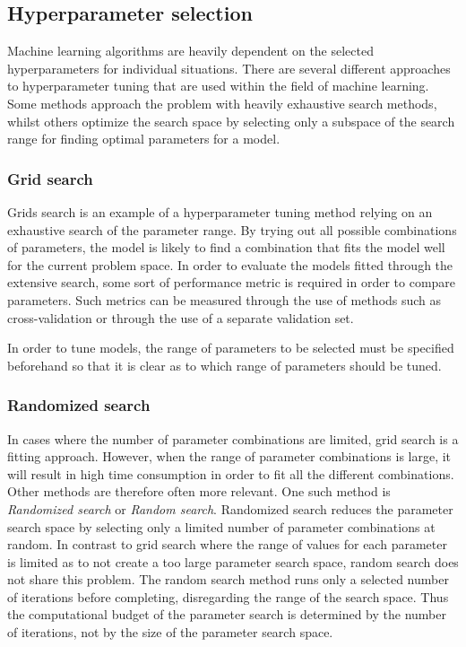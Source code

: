 \subsection{Hyperparameter selection}
\label{section:BT:Hyperparameters}

Machine learning algorithms are heavily dependent on the selected hyperparameters for individual situations.
There are several different approaches to hyperparameter tuning that are used within the field of machine learning.
Some methods approach the problem with heavily exhaustive search methods,
whilst others optimize the search space by selecting only a subspace of the search range for finding optimal parameters for a model.

\subsubsection{Grid search}
Grids search is an example of a hyperparameter tuning method relying on an exhaustive search of the parameter range.
By trying out all possible combinations of parameters, the model is likely to find a combination that fits the model well for the current problem space.
In order to evaluate the models fitted through the extensive search, some sort of performance metric is required in order to compare parameters.
Such metrics can be measured through the use of methods such as cross-validation or through the use of a separate validation set.

In order to tune models, the range of parameters to be selected must be specified beforehand so that it is clear as to which range of parameters should be tuned.
\cite{Geron2017}


\subsubsection{Randomized search}
In cases where the number of parameter combinations are limited, grid search is a fitting approach.
However, when the range of parameter combinations is large, it will result in high time consumption in order to fit all the different combinations.
Other methods are therefore often more relevant.
One such method is \textit{Randomized search} or \textit{Random search}.
Randomized search reduces the parameter search space by selecting only a limited number of parameter combinations at random.
In contrast to grid search where the range of values for each parameter is limited as to not create a too large parameter search space,
random search does not share this problem.
The random search method runs only a selected number of iterations before completing, disregarding the range of the search space.
Thus the computational budget of the parameter search is determined by the number of iterations, not by the size of the parameter search space.
\cite{Geron2017}


